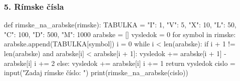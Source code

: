 \subsubsection*{5. Rímske čísla}
\begin{solution}
def rimske_na_arabske(rimske):
    TABULKA = {"I": 1, "V": 5, "X": 10, "L": 50, "C": 100, "D": 500, "M": 1000}
    arabske = []
    vysledok = 0
    for symbol in rimske:
        arabske.append(TABULKA[symbol])
    i = 0
    while i < len(arabske):
        if i + 1 != len(arabske) and arabske[i] < arabske[i + 1]:
            vysledok += arabske[i + 1] - arabske[i]
            i += 2
        else:
            vysledok += arabske[i]
            i += 1
    return vysledok
cislo = input("Zadaj rímske číslo: ")
print(rimske_na_arabske(cislo))
\end{solution}

